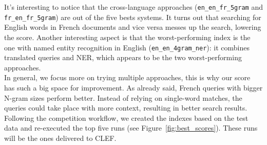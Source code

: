 It's interesting to notice that the cross-language approaches (\texttt{en\_en\_fr\_5gram} and \texttt{fr\_en\_fr\_5gram}) are out of the five bests systems.
It turns out that searching for English words in French documents and vice versa messes up the search, lowering the score.
Another interesting aspect is that the worst-performing index is the one with named entity recognition in English (\texttt{en\_en\_4gram\_ner}): it combines translated queries and NER, which appears to be the two worst-performing approaches.\\
In general, we focus more on trying multiple approaches, this is why our score has such a big space for improvement.
As already said, French queries with bigger N-gram sizes perform better.
Instead of relying on single-word matches, the queries could take place with more context, resulting in better search
results.\\
Following the competition workflow, we created the indexes based on the test data and re-executed the top five
runs (see Figure~\ref{fig:best_scores}). These runs will be the ones delivered to CLEF.
